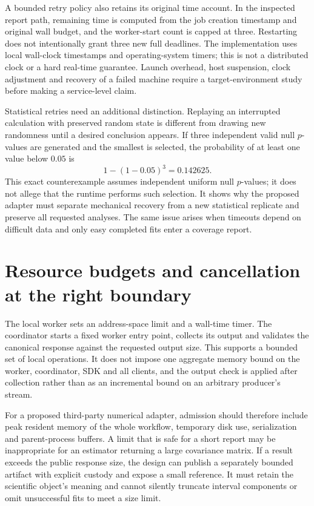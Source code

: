 A bounded retry policy also retains its original time account. In the
inspected report path, remaining time is computed from the job creation
timestamp and original wall budget, and the worker-start count is capped at
three. Restarting does not intentionally grant three new full deadlines.
The implementation uses local wall-clock timestamps and operating-system
timers; this is not a distributed clock or a hard real-time guarantee.
Launch overhead, host suspension, clock adjustment and recovery of a failed
machine require a target-environment study before making a service-level
claim\cite{exec13_ops_source}.

Statistical retries need an additional distinction. Replaying an interrupted
calculation with preserved random state is different from drawing new
randomness until a desired conclusion appears. If three independent valid
null $p$-values are generated and the smallest is selected, the probability
of at least one value below $0.05$ is
\[
 1-(1-0.05)^3=0.142625.
\]
This exact counterexample assumes independent uniform null $p$-values;
it does not allege that the runtime performs such selection. It shows why
the proposed adapter must separate mechanical recovery from a new statistical
replicate and preserve all requested analyses. The same issue arises when
timeouts depend on difficult data and only easy completed fits enter a
coverage report\cite{exec13_ops_exact}.

\section{Resource budgets and cancellation at the right boundary}

The local worker sets an address-space limit and a wall-time timer. The
coordinator starts a fixed worker entry point, collects its output and
validates the canonical response against the requested output size. This
supports a bounded set of local operations. It does not impose one aggregate
memory bound on the worker, coordinator, SDK and all clients, and the output
check is applied after collection rather than as an incremental bound on an
arbitrary producer's stream\cite{exec13_ops_source}.

For a proposed third-party numerical adapter, admission should therefore
include peak resident memory of the whole workflow, temporary disk use,
serialization and parent-process buffers. A limit that is safe for a short
report may be inappropriate for an estimator returning a large covariance
matrix. If a result exceeds the public response size, the design can publish
a separately bounded artifact with explicit custody and expose a small
reference. It must retain the scientific object's meaning and cannot silently
truncate interval components or omit unsuccessful fits to meet a size limit.

